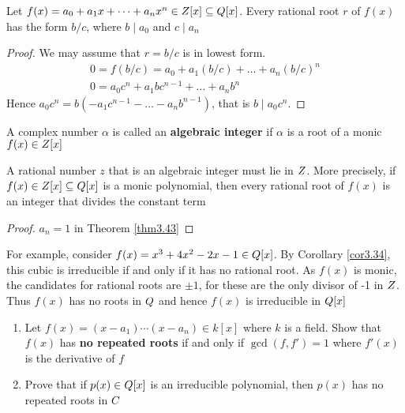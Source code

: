 \documentclass[11pt]{article}
\begin{document}
\begin{theorem}[]
\label{thm3.43}
Let \(f(x)=a_0+a_1x+\dots+a_nx^n\in\relax{Z}[x]\subseteq\relax{Q}[x]\). Every rational root
\(r\) of \(f(x)\) has the form \(b/c\), where \(b\mid a_0\) and \(c\mid a_n\)
\end{theorem}

\begin{proof}
We may assume that \(r=b/c\) is in lowest form. 
\begin{gather*}
0=f(b/c)=a_0+a_1(b/c)+\dots+a_n(b/c)^n\\
0=a_0c^n+a_1bc^{n-1}+\dots+a_nb^n
\end{gather*}
Hence \(a_0c^n=b(-a_1c^{n-1}-\dots-a_nb^{n-1})\), that is \(b\mid a_0c^n\).
\end{proof}

\begin{definition}[]
A complex number \(\alpha\) is called an \textbf{algebraic integer} if \(\alpha\) is a root of a monic
\(f(x)\in\relax{Z}[x]\)
\end{definition}

\begin{corollary}[]
\label{cor3.44}
A rational number \(z\) that is an algebraic integer must lie in \(\relax{Z}\). More
precisely, if \(f(x)\in\relax{Z}[x]\subseteq\relax{Q}[x]\) is a monic polynomial, then
every rational root of \(f(x)\) is an integer that divides the constant term
\end{corollary}

\begin{proof}
\(a_n=1\) in Theorem \ref{thm3.43}
\end{proof}

For example, consider \(f(x)=x^3+4x^2-2x-1\in\relax{Q}[x]\). By Corollary
\ref{cor3.34}, this cubic is irreducible if and only if it has no rational
root. As \(f(x)\) is monic, the candidates for rational roots are \(\pm 1\),
for these are the only divisor of -1 in \(\relax{Z}\). Thus \(f(x)\) has no roots in
\(\relax{Q}\) and hence \(f(x)\) is irreducible in \(\relax{Q}[x]\)

\begin{exercise}
\label{ex3.37}
\begin{enumerate}
\item Let \(f(x)=(x-a_1)\cdots(x-a_n)\in k[x]\) where \(k\) is a field. Show that
\(f(x)\) has \textbf{no repeated roots} if and only if \(\gcd(f,f')=1\) where
\(f'(x)\) is the derivative of \(f\)
\item Prove that if \(p(x)\in\relax{Q}[x]\) is an irreducible polynomial, then \(p(x)\)
has no repeated roots in \(\relax{C}\)
\end{enumerate}
\end{exercise}
\end{document}
